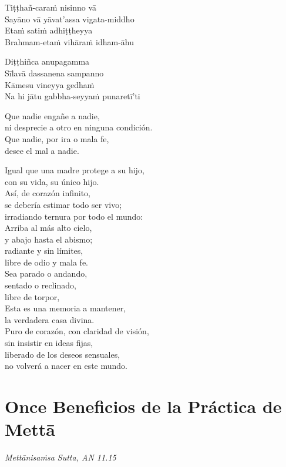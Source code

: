 Tiṭṭhañ-caraṁ nisinno vā\\
Sayāno vā yāvat'assa vigata-middho\\
Etaṁ satiṁ adhiṭṭheyya\\
Brahmam-etaṁ vihāraṁ idham-āhu

Diṭṭhiñca anupagamma\\
Sīlavā dassanena sampanno\\
Kāmesu vineyya gedhaṁ\\
Na hi jātu gabbha-seyyaṁ punaretī'ti

\clearpage

Que nadie engañe a nadie,\\
ni desprecie a otro en ninguna condición.\\
Que nadie, por ira o mala fe,\\
desee el mal a nadie.

Igual que una madre protege a su hijo,\\
con su vida, su único hijo.\\
Así, de corazón infinito,\\
se debería estimar todo ser vivo;\\
irradiando ternura por todo el mundo:\\
Arriba al más alto cielo,\\
y abajo hasta el abismo;\\
radiante y sin límites,\\
libre de odio y mala fe.\\
Sea parado o andando,\\
sentado o reclinado,\\
libre de torpor,\\
Esta es una memoria a mantener,\\
la verdadera casa divina.\\

Puro de corazón, con claridad de visión,\\
sin insistir en ideas fijas,\\
liberado de los deseos sensuales,\\
no volverá a nacer en este mundo.

\chapter[Once Beneficios]{Once Beneficios de la Práctica de Mettā}

\emph{Mettānisaṁsa Sutta, AN 11.15}


